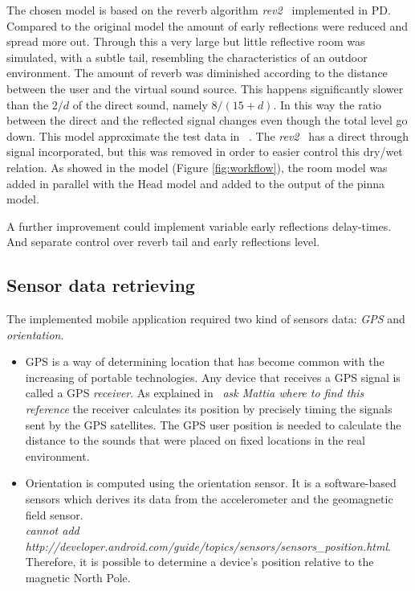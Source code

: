 \documentclass[journal]{IEEEtran}
\begin{document}
The chosen model is based on the reverb algorithm \textit{rev2~} implemented in PD. Compared to the original model the amount of early reflections were reduced and spread more out. Through this a very large but little reflective room was simulated, with a subtle tail, resembling the characteristics of an outdoor environment. The amount of reverb was diminished according to the distance between the user and the virtual sound source. This happens significantly slower than the $2/d$ of the direct sound, namely $8/(15+d)$. In this way the ratio between the direct and the reflected signal changes even though the total level go down. This model approximate the test data in ~\cite{begault19943}. The \textit{rev2~} has a direct through signal incorporated, but this was removed in order to easier control this dry/wet relation. As showed in the model (Figure \ref{fig:workflow}), the room model was added in parallel with the Head model and added to the output of the pinna model. 

A further improvement could implement variable early reflections delay-times. And separate control over reverb tail and early reflections level.



\subsection{Sensor data retrieving}
The implemented mobile application required two kind of sensors data: \emph{GPS} and \emph{orientation}. 
\begin{itemize}  
\item GPS is a way of determining location that has become common with the increasing of portable technologies. Any device that receives a GPS signal is  called a GPS \emph{receiver}. As explained in~\cite{} {\footnotesize{\textit{ask Mattia where to find this reference}}} the receiver calculates its position by precisely timing the signals sent by the GPS satellites.
The GPS user position is needed to calculate the distance to the sounds that were placed on fixed locations in the real environment. 
\item Orientation is computed using the orientation sensor. It is a software-based sensors which derives its data from the accelerometer and the geomagnetic field sensor.
\\
{\footnotesize{\textit{cannot add \\ http://developer.android.com/guide/topics/sensors/sensors\_position.html}}}. 
\\
Therefore, it is possible to determine a device's position relative to the magnetic North Pole.
\end{itemize}
\end{document}

